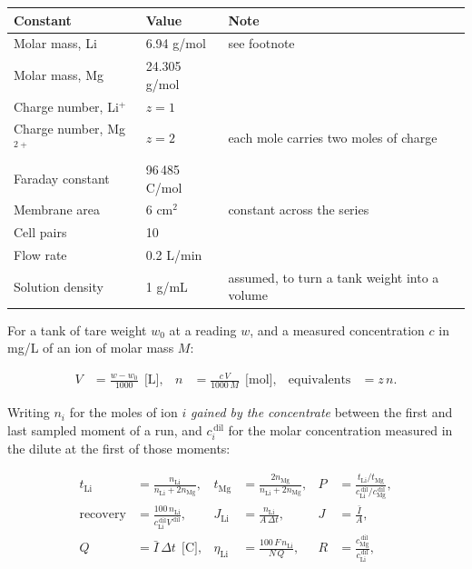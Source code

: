 \documentclass[11pt,a4paper]{article}
\begin{document}
\begin{center}
\small
\begin{tabular}{@{}l l l@{}}
\toprule
Constant & Value & Note \\
\midrule
Molar mass, Li & 6.94 g/mol & see footnote \\
Molar mass, Mg & 24.305 g/mol & \\
Charge number, Li$^+$ & $z = 1$ & \\
Charge number, Mg$^{2+}$ & $z = 2$ & each mole carries two moles of charge \\
Faraday constant & 96\,485 C/mol & \\
Membrane area & 6 cm$^2$ & constant across the series \\
Cell pairs & 10 & \\
Flow rate & 0.2 L/min & \\
Solution density & 1 g/mL & assumed, to turn a tank weight into a volume \\
\bottomrule
\end{tabular}
\end{center}

For a tank of tare weight $w_0$ at a reading $w$, and a measured concentration $c$ in mg/L of
an ion of molar mass $M$:

\begin{align}
V &= \frac{w - w_0}{1000} \ \ \text{[L]},
&
n &= \frac{c\,V}{1000\,M} \ \ \text{[mol]},
&
\text{equivalents} &= z\,n .
\end{align}

Writing $n_i$ for the moles of ion $i$ \emph{gained by the concentrate} between the first and
last sampled moment of a run, and $c_i^{\,\mathrm{dil}}$ for the molar concentration measured
in the dilute at the first of those moments:

\begin{align}
t_{\mathrm{Li}} &= \frac{n_{\mathrm{Li}}}{n_{\mathrm{Li}} + 2n_{\mathrm{Mg}}},
&
t_{\mathrm{Mg}} &= \frac{2n_{\mathrm{Mg}}}{n_{\mathrm{Li}} + 2n_{\mathrm{Mg}}},
&
P &= \frac{t_{\mathrm{Li}}/t_{\mathrm{Mg}}}{c_{\mathrm{Li}}^{\,\mathrm{dil}} / c_{\mathrm{Mg}}^{\,\mathrm{dil}}},
\\[0.4em]
\text{recovery} &= \frac{100\,n_{\mathrm{Li}}}{c_{\mathrm{Li}}^{\,\mathrm{dil}} V^{\,\mathrm{dil}}},
&
J_{\mathrm{Li}} &= \frac{n_{\mathrm{Li}}}{A\,\Delta t},
&
J &= \frac{\bar{I}}{A},
\\[0.4em]
Q &= \bar{I}\,\Delta t \ \ \text{[C]},
&
\eta_{\mathrm{Li}} &= \frac{100\,F\,n_{\mathrm{Li}}}{N\,Q},
&
R &= \frac{c_{\mathrm{Mg}}^{\,\mathrm{dil}}}{c_{\mathrm{Li}}^{\,\mathrm{dil}}},
\end{align}
\end{document}
